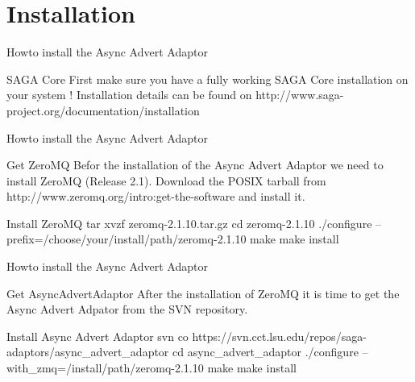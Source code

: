 \documentclass{beamer}
\begin{document}
  \section{Installation}
    \begin{frame}{Howto install the Async Advert Adaptor}
       \begin{alertblock}{SAGA Core}
         First make sure you have a fully working SAGA Core installation on your system ! 
         Installation details can be found on http://www.saga-project.org/documentation/installation
       \end{alertblock}
    \end{frame}
    
    \begin{frame}{Howto install the Async Advert Adaptor}
      \begin{block}{Get ZeroMQ}
        Befor the installation of the Async Advert Adaptor we need to install ZeroMQ (Release 2.1). 
        Download the POSIX tarball from http://www.zeromq.org/intro:get-the-software and install it.
      \end{block}
      
      \begin{exampleblock}{Install ZeroMQ}
         tar xvzf zeromq-2.1.10.tar.gz \newline
         cd zeromq-2.1.10 \newline
         ./configure --prefix=/choose/your/install/path/zeromq-2.1.10 \newline
         make \newline
         make install
      \end{exampleblock}
    \end{frame}
    
    \begin{frame}{Howto install the Async Advert Adaptor}
      \begin{block}{Get AsyncAdvertAdaptor}
        After the installation of ZeroMQ it is time to get the Async Advert Adpator
        from the SVN repository. 
      \end{block}
      
      \begin{exampleblock}{Install Async Advert Adaptor}
        svn co https://svn.cct.lsu.edu/repos/saga-adaptors/async\_advert\_adaptor \newline
        cd async\_advert\_adaptor \newline
        ./configure --with\_zmq=/install/path/zeromq-2.1.10 \newline
        make \newline
        make install
      \end{exampleblock}
    \end{frame}
    
\end{document}
